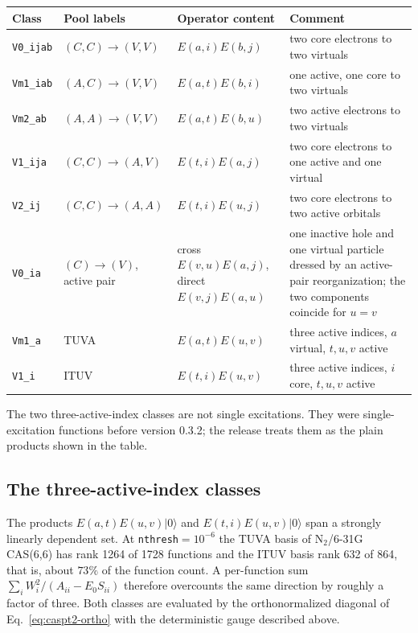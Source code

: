 \begin{center}
\small
\begin{tabularx}{\textwidth}{>{\raggedright\arraybackslash}p{}>{\raggedright\arraybackslash}p{}>{\raggedright\arraybackslash}p{}X}
\toprule
Class & Pool labels & Operator content & Comment \\
\midrule
\texttt{V0\_ijab} & $(C,C)\to(V,V)$ &
  $E(a,i)E(b,j)$ & two core electrons to two virtuals \\
\texttt{Vm1\_iab} & $(A,C)\to(V,V)$ &
  $E(a,t)E(b,i)$ & one active, one core to two virtuals \\
\texttt{Vm2\_ab} & $(A,A)\to(V,V)$ &
  $E(a,t)E(b,u)$ & two active electrons to two virtuals \\
\texttt{V1\_ija} & $(C,C)\to(A,V)$ &
  $E(t,i)E(a,j)$ & two core electrons to one active and one virtual \\
\texttt{V2\_ij} & $(C,C)\to(A,A)$ &
  $E(t,i)E(u,j)$ & two core electrons to two active orbitals \\
\texttt{V0\_ia} & $(C)\to(V)$, active pair &
  cross $E(v,u)E(a,j)$, direct $E(v,j)E(a,u)$ &
  one inactive hole and one virtual particle dressed by an active-pair
  reorganization; the two components coincide for $u=v$ \\
\texttt{Vm1\_a} & TUVA &
  $E(a,t)E(u,v)$ & three active indices, $a$ virtual,
  $t,u,v$ active \\
\texttt{V1\_i} & ITUV &
  $E(t,i)E(u,v)$ & three active indices, $i$ core,
  $t,u,v$ active \\
\bottomrule
\end{tabularx}
\end{center}

The two three-active-index classes are not single excitations.  They
were single-excitation functions before version 0.3.2; the release
treats them as the plain products shown in the table.

\subsection{The three-active-index classes}
\label{sec:caspt2-tuva}

The products $E(a,t)E(u,v)|0\rangle$ and $E(t,i)E(u,v)|0\rangle$ span a
strongly linearly dependent set.  At \texttt{nthresh}$=10^{-6}$ the
TUVA basis of N$_2$/6-31G CAS(6,6) has rank 1264 of 1728 functions and
the ITUV basis rank 632 of 864, that is, about $73\%$ of the function
count.  A per-function sum $\sum_i W_i^2/(A_{ii}-E_0S_{ii})$ therefore
overcounts the same direction by roughly a factor of three.  Both
classes are evaluated by the orthonormalized diagonal of
Eq.~\eqref{eq:caspt2-ortho} with the deterministic gauge described
above.

